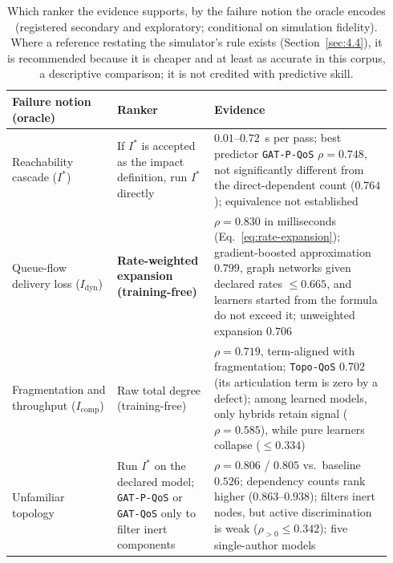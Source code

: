 \documentclass[preprint,3p]{elsarticle}
\begin{document}
\begin{table}[htbp]
\centering
\small
\caption{Which ranker the evidence supports, by the failure notion the oracle encodes (registered secondary and exploratory; conditional on simulation fidelity). Where a reference restating the simulator's rule exists (Section~\ref{sec:4.4}), it is recommended because it is cheaper and at least as accurate in this corpus, a descriptive comparison; it is not credited with predictive skill.}
\label{tab:guidance}
\begin{tabular}{@{}p{0.26\linewidth}>{\raggedright\arraybackslash}p{0.24\linewidth}p{0.44\linewidth}@{}}
\toprule
\textbf{Failure notion (oracle)} & \textbf{Ranker} & \textbf{Evidence} \\
\midrule
Reachability cascade ($I^*$) & If $I^*$ is accepted as the impact definition, run $I^*$ directly & $0.01$--$0.72$~s per pass; best predictor \texttt{GAT-P-QoS} $\rho = 0.748$, not significantly different from the direct-dependent count ($0.764$); equivalence not established \\
Queue-flow delivery loss ($I_{\text{dyn}}$) & \textbf{Rate-weighted expansion (training-free)} & $\rho = 0.830$ in milliseconds (Eq.~\eqref{eq:rate-expansion}); gradient-boosted approximation $0.799$, graph networks given declared rates $\le 0.665$, and learners started from the formula do not exceed it; unweighted expansion $0.706$ \\
Fragmentation and throughput ($I_{\text{comp}}$) & Raw total degree (training-free) & $\rho = 0.719$, term-aligned with fragmentation; \texttt{Topo-QoS} $0.702$ (its articulation term is zero by a defect); among learned models, only hybrids retain signal ($\rho = 0.585$), while pure learners collapse ($\le 0.334$) \\
Unfamiliar topology & Run $I^*$ on the declared model; \texttt{GAT-P-QoS} or \texttt{GAT-QoS} only to filter inert components & $\rho = 0.806$ / $0.805$ vs.\ baseline $0.526$; dependency counts rank higher ($0.863$--$0.938$); filters inert nodes, but active discrimination is weak ($\rho_{>0} \le 0.342$); five single-author models \\
\bottomrule
\end{tabular}
\end{table}
\end{document}
